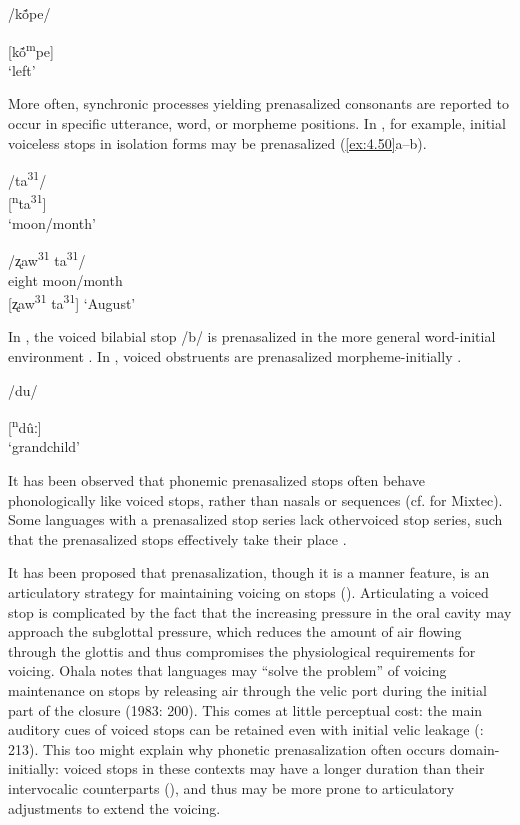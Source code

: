 \ea\label{ex:4.49}

/kṍpe/

[kṍ\textsuperscript{m}pe]\\
\glt ‘left’
\citep[11]{West1980}
\z

  More often, synchronic processes yielding prenasalized consonants are report\-ed to occur in specific utterance, word, or morpheme positions. In , for example, initial voiceless stops in isolation forms may be prenasalized (\ref{ex:4.50}a--b).

\ea\label{ex:4.50}

\ea  /ta\textsuperscript{31}/\\{}
  [\textsuperscript{n}ta\textsuperscript{31}]\\
\glt  ‘moon/month’

\ex  /ʐaw\textsuperscript{31}   ta\textsuperscript{31}/\\
  eight   moon/month\\{}
  [ʐaw\textsuperscript{31} ta\textsuperscript{31}]
\glt  ‘August’
\citep[40]{Shen2003}
\z
\z

  In , the voiced bilabial stop /b/ is prenasalized in the more general word-initial environment \citep{Fedden2007}. In , voiced obstruents are prenasalized morpheme-initially .

\ea\label{ex:4.51}

/du/

[\textsuperscript{n}dûː]\\
\glt ‘grandchild’
\citep[54]{Epps2008}
\z

  It has been observed that phonemic prenasalized stops often behave phonologically like voiced stops, rather than nasals or sequences (cf. \citealt{IversonSalmons1996} for Mixtec). Some languages with a prenasalized stop series lack other\linebreak voiced stop series, such that the prenasalized stops effectively take their place \citep[67--68]{Maddieson1984}.

  It has been proposed that prenasalization, though it is a manner feature, is an articulatory strategy for maintaining voicing on stops (\citealt{Ohala1983,HentonEtAl1992}). Articulating a voiced stop is complicated by the fact that the increasing pressure in the oral cavity may approach the subglottal pressure, which reduces the amount of air flowing through the glottis and thus compromises the physiological requirements for voicing. Ohala notes that languages may “solve the problem” of voicing maintenance on stops by releasing air through the velic port during the initial part of the closure (1983: 200). This comes at little perceptual cost: the main auditory cues of voiced stops can be retained even with initial velic leakage (\citealt{OhalaOhala1991}: 213). This too might explain why phonetic prenasalization often occurs domain-initially: voiced stops in these contexts may have a longer duration than their intervocalic counterparts (\citealt{FlegeBrown1982}), and thus may be more prone to articulatory adjustments to extend the voicing.


